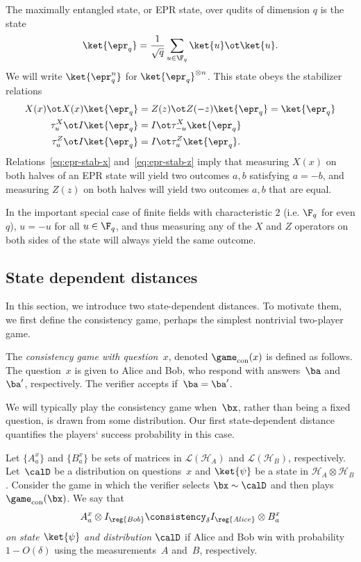 The maximally entangled state, or EPR state, over qudits of dimension
$q$ is the state
\[ \ket{\epr_q} = \frac{1}{\sqrt{q}} \sum_{u \in \F_q} \ket{u} \ot \ket{u}. \]
We will write $\ket{\epr_q^n}$ for $\ket{\epr_q}^{\otimes n}$.
This state obeys the stabilizer relations
\begin{align}
  X(x) \ot X(x) \ket{\epr_q} &= Z(z) \ot Z(-z) \ket{\epr_q} =
                             \ket{\epr_q} \label{eq:epr-stab} \\
  \tau^X_u \ot I \ket{\epr_q} &= I \ot \tau^X_{-u}
                              \ket{\epr_q} \label{eq:epr-stab-x} \\
  \tau^Z_u \ot I \ket{\epr_q} &= I \ot \tau^Z_{u} \ket{\epr_q} \label{eq:epr-stab-z}.
\end{align}
Relations~\eqref{eq:epr-stab-x} and~\eqref{eq:epr-stab-z} imply that
measuring $X(x)$ on both halves of an EPR state will yield two
outcomes $a,b$ satisfying $a = -b$, and measuring $Z(z)$ on both
halves will yield two outcomes $a,b$ that are equal.

In the important special case of finite fields with characteristic $2$
(i.e. $\F_q$ for even $q$), $u = -u$ for all $u \in \F_q$, and thus
measuring any of the $X$ and $Z$ operators on both sides of the state
will always yield the same outcome. 

  
\subsection{State dependent distances}

In this section, we introduce two state-dependent distances.
To motivate them, we first define the consistency game, perhaps the simplest nontrivial two-player game.

\begin{definition}
The \emph{consistency game with question~$x$}, denoted $\game_{\mathrm{con}}(x)$ is defined as follows.
The question~$x$ is given to Alice and Bob, who respond with answers~$\ba$ and~$\ba'$, respectively.
The verifier accepts if~$\ba = \ba'$.
\end{definition}

We will typically play the consistency game when~$\bx$, rather than being a fixed question, is drawn from some distribution.
Our first state-dependent distance quantifies the players` success probability in this case.

\begin{definition}
Let $\{A^x_a\}$ and $\{B^x_a\}$ be sets of matrices in $\mathcal{L}(\mathcal{H}_A)$ and $\mathcal{L}(\mathcal{H}_B)$, respectively.
Let~$\calD$ be a distribution on questions~$x$ and $\ket{\psi}$ be a state in $\mathcal{H}_A \otimes \mathcal{H}_B$.
Consider the game in which the verifier selects $\bx \sim \calD$ and then plays $\game_{\mathrm{con}}(\bx)$.
We say that
\begin{equation*}
A^x_a \otimes I_{\reg{Bob}} \consistency_{\delta} I_{\reg{Alice}} \otimes B^x_a
\end{equation*}
\emph{on state $\ket{\psi}$ and distribution $\calD$} if
Alice and Bob win with probability~$1-O(\delta)$ using the measurements~$A$ and~$B$, respectively.
\end{definition}

